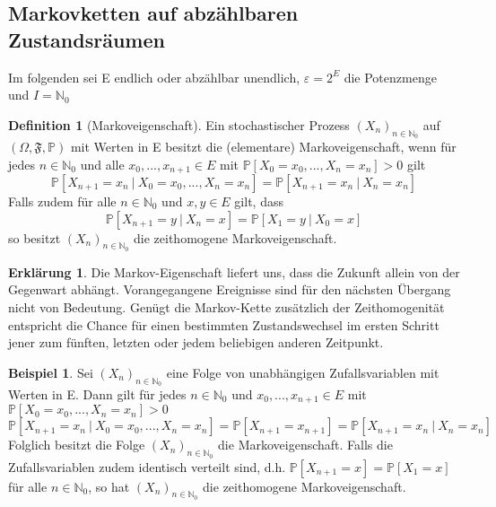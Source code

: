 \documentclass[a4paper,12pt]{scrartcl}
\theoremstyle{definition}
\newtheorem{beti}{Erklärung}[section]
\newtheorem{bsp}{Beispiel}[section]
\newtheorem{defi}{Definition}[section]
\begin{document}
\subsection{Markovketten auf abzählbaren Zustandsräumen}
Im folgenden sei E endlich oder abzählbar unendlich, $\varepsilon = 2^{E}$ die Potenzmenge und $I = \mathbb{N}_{0}$ 
\begin{defi}[Markoveigenschaft]
Ein stochastischer Prozess $(X_{n})_{n \in \mathbb{N}_{0}}$ auf $(\Omega, \mathfrak{F}, \mathbb{P})$ mit Werten in E besitzt die (elementare) Markoveigenschaft, wenn für jedes $n \in \mathbb{N}_{0}$ und alle $x_{0},...,x_{n+1} \in E$ mit $\mathbb{P}[X_{0} = x_{0},...,X_{n} = x_{n}]>0$ gilt
\begin{equation*}
\mathbb{P}[X_{n+1} = x_{n} \: | \: X_{0} = x_{0},...,X_{n} = x_{n}] = \mathbb{P}[X_{n+1} = x_{n} \: | \: X_{n} = x_{n}] 
\end{equation*}
Falls zudem für alle $n \in \mathbb{N}_{0}$ und $x,y \in E$ gilt, dass
\begin{equation*}
\mathbb{P}[X_{n+1} = y \: | \: X_{n} = x] = \mathbb{P}[X_{1} = y \: | \: X_{0} = x]
\end{equation*}
so besitzt $(X_{n})_{n \in \mathbb{N}_{0}}$ die zeithomogene Markoveigenschaft.
\end{defi}
\begin{beti}
Die Markov-Eigenschaft liefert uns, dass die Zukunft allein von der Gegenwart abhängt. Vorangegangene Ereignisse sind für den nächsten Übergang nicht von Bedeutung. Genügt die Markov-Kette zusätzlich der Zeithomogenität entspricht die Chance für einen bestimmten Zustandswechsel im ersten Schritt jener zum fünften, letzten oder
jedem beliebigen anderen Zeitpunkt.
\end{beti}
\begin{bsp}
Sei $(X_{n})_{n \in \mathbb{N}_{0}}$ eine Folge von unabhängigen Zufallsvariablen mit Werten in E. Dann gilt für jedes $n \in \mathbb{N}_{0}$ und $x_{0},...,x_{n+1} \in E$ mit $\mathbb{P}[X_{0} = x_{0},...,X_{n} = x_{n}]>0$
\begin{equation*}
\mathbb{P}[X_{n+1} = x_{n} \: | \: X_{0} = x_{0},...,X_{n} = x_{n}] = \mathbb{P}[X_{n+1} = x_{n+1}] = \mathbb{P}[X_{n+1} = x_{n} \: | \: X_{n} = x_{n}]
\end{equation*}
Folglich besitzt die Folge $(X_{n})_{n \in \mathbb{N}_{0}}$ die Markoveigenschaft. Falls die Zufallsvariablen zudem identisch verteilt sind, d.h. $\mathbb{P}[X_{n+1} = x] = \mathbb{P}[X_{1} = x]$ für alle $n \in \mathbb{N}_{0}$, so hat $(X_{n})_{n \in \mathbb{N}_{0}}$ die zeithomogene Markoveigenschaft.
\end{bsp}
\end{document}
